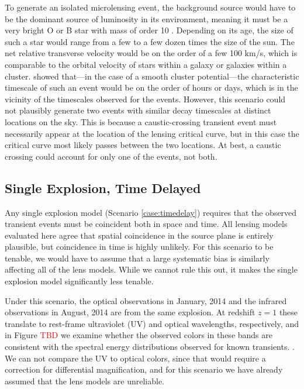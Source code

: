 To generate an isolated microlensing event, the background source
would have to be the dominant source of luminosity in its environment,
meaning it must be a very bright O or B star with mass of order 10
\Msun.  Depending on its age, the size of such a star would range from
a few to a few dozen times the size of the sun.  The net relative
transverse velocity would be on the order of a few 100 km/s, which is
comparable to the orbital velocity of stars within a galaxy or
galaxies within a cluster.  \citet{MiraldaEscude:1991} showed
that---in the case of a smooth cluster potential---the
%
%
%
characteristic timescale of such an event would be on the order of
hours or days, which is in the vicinity of the timescales observed for
the \spock events.  However, this scenario could not plausibly
generate two events with similar decay timescales at distinct
locations on the sky.  This is because a caustic-crossing transient
event must necessarily appear at the location of the lensing critical
curve, but in this case the critical curve most likely passes between
the two \spock locations. At best, a caustic crossing could account
for only one of the \spock events, not both.


\subsection{Single Explosion, Time Delayed}

Any single explosion model (Scenario \ref{case:timedelay}) requires that the observed
transient events must be coincident both in space and time.  All
lensing models evaluated here agree that spatial coincidence in the
source plane is entirely plausible, but coincidence in time is highly
unlikely. For this scenario to be tenable, we would have to assume
that a large systematic bias is similarly affecting all of the lens
models.  While we cannot rule this out, it makes the single explosion
model significantly less tenable. 

Under this scenario, the optical observations in January, 2014 and the
infrared observations in August, 2014 are from the same explosion. At
redshift $z=1$ these translate to rest-frame ultraviolet (UV) and
optical wavelengths, respectively, and in Figure \textcolor{red}{TBD}
we examine whether the observed colors in these bands are consistent
with the spectral energy distributions observed for known transients.
.  We can not
compare the UV to optical colors, since that would require a
correction for differential magnification, and for this scenario we
have already assumed that the lens models are unreliable. 



